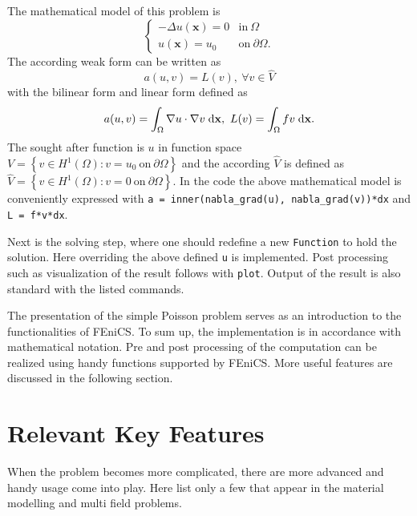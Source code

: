 The mathematical model of this problem is 
\begin{equation}
\label{eq: poisson}
\left\{
\begin{array}{ll}
-\Delta u(\mathbf{x})=0 & \text{in} \ \Omega \\
u(\mathbf{x})=u_{0} & \text{on} \ \partial \Omega .
\end{array}
\right.
\end{equation}
The according weak form can be written as
\begin{equation}
\label{eq: weak}
a(u,v) = L(v), \ \forall v \in \hat{V}
\end{equation}
with the bilinear form and linear form defined as
\[
a(u,v) = \int_{\Omega} \nabla{u} \cdot \nabla{v} \;\mathrm{d}{\mathbf{x}}, \ L(v) = \int_{\Omega} fv \;\mathrm{d}{\mathbf{x}}.
\]
The sought after function is $u$ in function space $V = \left\lbrace v \in H^{1}\left( \Omega \right) : v=u_{0} \  \text{on} \ \partial \Omega \right\rbrace$ and the according $\hat{V}$ is defined as $\hat{V} = \left\lbrace v \in H^{1}\left( \Omega \right) : v=0 \  \text{on} \ \partial \Omega \right\rbrace$. In the code the above mathematical model is conveniently expressed with \texttt{a\ =\ inner(nabla\_grad(u),\ nabla\_grad(v))*dx} and \texttt{L\ =\ f*v*dx}.

Next is the solving step, where one should redefine a new \texttt{Function} to hold the solution. Here overriding the above defined \texttt{u} is implemented. Post processing such as visualization of the result follows with \texttt{plot}. Output of the result is also standard with the listed commands.

The presentation of the simple Poisson problem serves as an introduction to the functionalities of FEniCS. To sum up, the implementation is in accordance with mathematical notation. Pre and post processing of the computation can be realized using handy functions supported by FEniCS. More useful features are discussed in the following section.

\section{Relevant Key Features}
When the problem becomes more complicated, there are more advanced and handy usage come into play. Here list only a few that appear in the material modelling and multi field problems.

